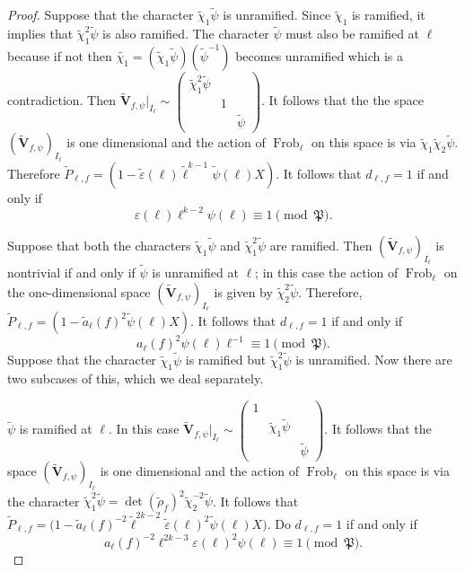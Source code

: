 \documentclass{amsart}
\newcommand{\bV}{\mathbf{V}}
\newcommand{\Frob}{\operatorname{Frob}}
\newtheorem{auxiliary proposition}[theorem]{Auxiliary Proposition}
\newtheorem{main conjecture}[theorem]{Main Conjecture}
\newtheorem{main theorem}[theorem]{Main Theorem}
\newtheorem{modesty proposition}[theorem]{Modesty Proposition}
\newtheorem{open problem}[theorem]{Open Problem}
\newtheorem{convergence lemma}[theorem]{Convergence Lemma}
\newtheorem{corrected lemma}[theorem]{Corrected Lemma}
\newtheorem{growth lemma}[theorem]{Growth Lemma}
\newtheorem{coefficient lemma}[theorem]{Integrality Lemma}
\newtheorem{interpolation lemma}[theorem]{Interpolation Lemma}
\newtheorem{kernel lemma}[theorem]{Kernel Lemma}
\newtheorem{limit lemma}[theorem]{Limit Lemma}
\newtheorem{tandem lemma}[theorem]{Modesty Lemma}
\newtheorem{zero-finding lemma}[theorem]{Zero-Finding Lemma}
\begin{document}
\begin{proof} 
 Suppose that the character $\tilde{\chi}_1\tilde{\psi}$ is unramified. Since $\tilde{\chi}_1 $ is ramified, it implies that $\tilde{\chi}_1^2\tilde{\psi}$ is also ramified. The character $\tilde{\psi}$ must also be ramified at $\ell$ because if not then $\tilde{\chi_1}=(\tilde{\chi}_1\tilde{\psi})(\tilde{\psi}^{-1})$ becomes unramified which is a contradiction. 
Then 
$\tilde{\bV}_{f,\psi}|_{I_\ell}\sim \begin{pmatrix}
\tilde{\chi}_1^2\tilde{\psi} & ~ & ~\\
~ & 1 & ~\\
~ & ~ & \tilde{\psi}
\end{pmatrix}.$
It follows that the the space $(\tilde{\bV}_{f,\psi})_{I_\ell}$ is one dimensional and the action of $\Frob_\ell$ on this space is via $\tilde{\chi}_1\tilde{\chi}_2\tilde{\psi}$. Therefore $\tilde{P}_{\ell,f}=(1-\tilde{\varepsilon}(\ell)\tilde{\ell}^{k-1}\tilde{\psi}(\ell)X)$. It follows that $d_{\ell,f}=1$ if and only if 
\begin{equation}\label{casej1}
\varepsilon(\ell)\ell^{k-2}\psi(\ell)\equiv 1 \pmod{\mathfrak{P}}.
\end{equation}

 Suppose that both the characters $\tilde{\chi}_1\tilde{\psi}$ and $\tilde{\chi}_1^2\tilde{\psi}$ are ramified.
Then $(\tilde{\bV}_{f,\psi})_{I_\ell}$ is nontrivial if and only if $\tilde{\psi}$ is unramified at $\ell$; in this case the action of $\Frob_\ell$ on the one-dimensional space $(\tilde{\bV}_{f,\psi})_{I_\ell}$ is given by $\tilde{\chi}_2^2\tilde{\psi}$. Therefore, $\tilde{P}_{\ell,f}=(1-\tilde{a}_\ell(f)^2\tilde{\psi}(\ell)X)$. It follows that $d_{\ell,f}=1$ if and only if 
\begin{equation}\label{casejii}
a_\ell(f)^2\psi(\ell) \ell^{-1} \equiv 1 \pmod{\mathfrak{P}}.
\end{equation}
 Suppose that the character $\tilde{\chi}_1\tilde{\psi}$ is ramified but $\tilde{\chi}_1^2\tilde{\psi}$ is unramified.
Now there are two subcases of this, which we deal separately.

 $\tilde{\psi}$ is ramified at $\ell$. In this case 
$\tilde{\bV}_{f,\psi}|_{I_\ell}\sim \begin{pmatrix}
1 & ~ & ~\\
~ & \tilde{\chi}_1\tilde{\psi} & ~\\
~ & ~ & \tilde{\psi}
\end{pmatrix}.$ It follows that the space $(\tilde{\bV}_{f,\psi})_{I_\ell}$ is one dimensional and the action of $\Frob_\ell$ on this space is via the character $\tilde{\chi}_1^2\tilde{\psi}=\det(\tilde{\rho}_f)^2\tilde{\chi}_2^{-2}\tilde{\psi}$. It follows that $\tilde{P}_{\ell,f}=\big(1-\tilde{a}_\ell(f)^{-2}\tilde{\ell}^{2k-2}\tilde{\varepsilon}(\ell)^2\tilde{\psi}(\ell)X\big)$. Do $d_{\ell,f}=1$ if and only if 
\begin{equation}\label{casejiii}
{a}_\ell(f)^{-2}{\ell}^{2k-3}{\varepsilon}(\ell)^2{\psi}(\ell) \equiv 1 \pmod{\mathfrak{P}}.
\end{equation}


\end{proof}
\end{document}
